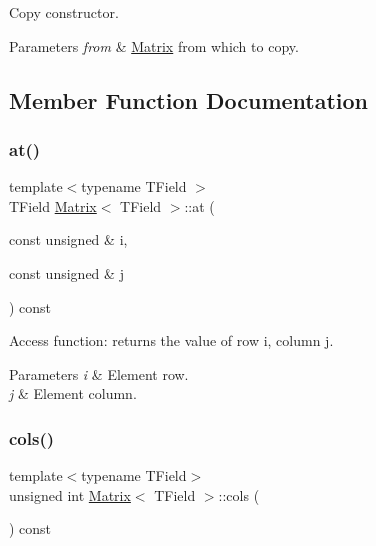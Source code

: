 Copy constructor. 


\begin{DoxyParams}{Parameters}
{\em from} & \mbox{\hyperlink{classMatrix}{Matrix}} from which to copy. \\
\hline
\end{DoxyParams}


\subsection{Member Function Documentation}
\mbox{\label{classMatrix_acafe521165ef5c2204fb621a52feecc6}} 
\subsubsection{\texorpdfstring{at()}{at()}}
{\footnotesize\ttfamily template$<$typename T\+Field $>$ \\
T\+Field \mbox{\hyperlink{classMatrix}{Matrix}}$<$ T\+Field $>$\+::at (\begin{DoxyParamCaption}\item[{const unsigned \&}]{i,  }\item[{const unsigned \&}]{j }\end{DoxyParamCaption}) const}



Access function\+: returns the value of row i, column j. 


\begin{DoxyParams}{Parameters}
{\em i} & Element row. \\
\hline
{\em j} & Element column. \\
\hline
\end{DoxyParams}
\mbox{\label{classMatrix_aec5c893960915183a1bf8eace12a45ac}} 
\subsubsection{\texorpdfstring{cols()}{cols()}}
{\footnotesize\ttfamily template$<$typename T\+Field$>$ \\
unsigned int \mbox{\hyperlink{classMatrix}{Matrix}}$<$ T\+Field $>$\+::cols (\begin{DoxyParamCaption}{ }\end{DoxyParamCaption}) const\hspace{0.3cm}{\ttfamily [inline]}}



